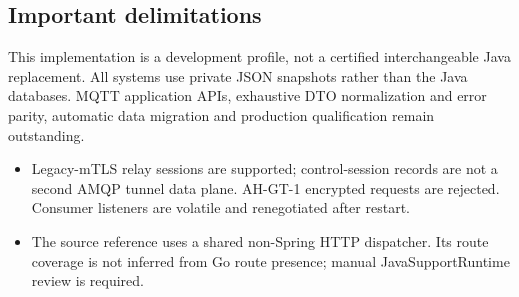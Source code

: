 \documentclass[a4paper]{arrowhead}
\begin{document}
\subsection{Important delimitations}
This implementation is a development profile, not a certified interchangeable Java replacement. All systems use private JSON snapshots rather than the Java databases. MQTT application APIs, exhaustive DTO normalization and error parity, automatic data migration and production qualification remain outstanding.
\begin{itemize}
\item Legacy-mTLS relay sessions are supported; control-session records are not a second AMQP tunnel data plane. AH-GT-1 encrypted requests are rejected. Consumer listeners are volatile and renegotiated after restart.
\item The source reference uses a shared non-Spring HTTP dispatcher. Its route coverage is not inferred from Go route presence; manual JavaSupportRuntime review is required.
\end{itemize}
\end{document}
